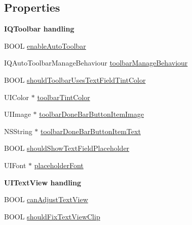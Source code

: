 \subsection*{Properties}
\begin{Indent}\textbf{ I\+Q\+Toolbar handling}\par
{\em 

 

 }\begin{DoxyCompactItemize}
\item 
B\+O\+OL \mbox{\hyperlink{interface_i_q_keyboard_manager_a45cba08658928da82a9b489257dd2ecc}{enable\+Auto\+Toolbar}}
\item 
I\+Q\+Auto\+Toolbar\+Manage\+Behaviour \mbox{\hyperlink{interface_i_q_keyboard_manager_a24f41d535c99522e3f2a03f97f061364}{toolbar\+Manage\+Behaviour}}
\item 
B\+O\+OL \mbox{\hyperlink{interface_i_q_keyboard_manager_a290b0a83e43203bc046f0c7fd7c765b6}{should\+Toolbar\+Uses\+Text\+Field\+Tint\+Color}}
\item 
U\+I\+Color $\ast$ \mbox{\hyperlink{interface_i_q_keyboard_manager_a4302c19748017c4ae58f83f04fd84d1f}{toolbar\+Tint\+Color}}
\item 
U\+I\+Image $\ast$ \mbox{\hyperlink{interface_i_q_keyboard_manager_a7dbfd50cb46dfb73cfbbde864f7dac1c}{toolbar\+Done\+Bar\+Button\+Item\+Image}}
\item 
N\+S\+String $\ast$ \mbox{\hyperlink{interface_i_q_keyboard_manager_af522d35b37c048c25e0ccae3533dbaf2}{toolbar\+Done\+Bar\+Button\+Item\+Text}}
\item 
B\+O\+OL \mbox{\hyperlink{interface_i_q_keyboard_manager_abc7128fe390ec9895445ecb36d5028a9}{should\+Show\+Text\+Field\+Placeholder}}
\item 
U\+I\+Font $\ast$ \mbox{\hyperlink{interface_i_q_keyboard_manager_aeabeeec7abcd3e002fc8a29758469e2c}{placeholder\+Font}}
\end{DoxyCompactItemize}
\end{Indent}
\begin{Indent}\textbf{ U\+I\+Text\+View handling}\par
{\em 

 

 }\begin{DoxyCompactItemize}
\item 
B\+O\+OL \mbox{\hyperlink{interface_i_q_keyboard_manager_a6bfa741ebc89cb779d9341422127f76b}{can\+Adjust\+Text\+View}}
\item 
B\+O\+OL \mbox{\hyperlink{interface_i_q_keyboard_manager_a266837780aceb8bd05945f428d77c9a9}{should\+Fix\+Text\+View\+Clip}}
\end{DoxyCompactItemize}
\end{Indent}

